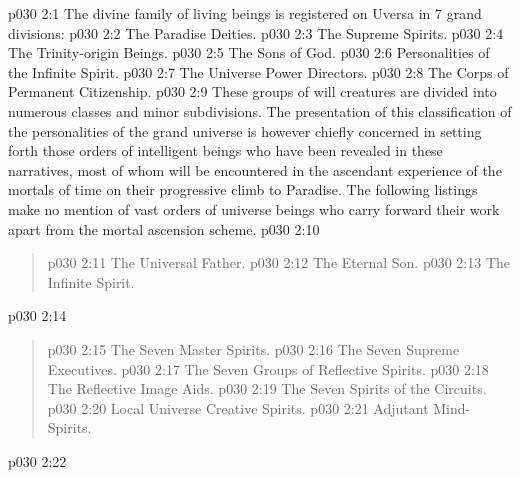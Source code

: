 \vs p030 2:1 The divine family of living beings is registered on Uversa in 7 grand divisions:
\vs p030 2:2 \bibnobreakspace The Paradise Deities.
\vs p030 2:3 \bibnobreakspace The Supreme Spirits.
\vs p030 2:4 \bibnobreakspace The Trinity\hyp{}origin Beings.
\vs p030 2:5 \bibnobreakspace The Sons of God.
\vs p030 2:6 \bibnobreakspace Personalities of the Infinite Spirit.
\vs p030 2:7 \bibnobreakspace The Universe Power Directors.
\vs p030 2:8 \bibnobreakspace The Corps of Permanent Citizenship.
\vs p030 2:9 \pc These groups of will creatures are divided into numerous classes and minor subdivisions. The presentation of this classification of the personalities of the grand universe is however chiefly concerned in setting forth those orders of intelligent beings who have been revealed in these narratives, most of whom will be encountered in the ascendant experience of the mortals of time on their progressive climb to Paradise. The following listings make no mention of vast orders of universe beings who carry forward their work apart from the mortal ascension scheme.
\vsetspace
\vs p030 2:10 \bibnobreakspace {}
\begin{quote}
\vs p030 2:11 \bibnobreakspace The Universal Father.
\vs p030 2:12 \bibnobreakspace The Eternal Son.
\vs p030 2:13 \bibnobreakspace The Infinite Spirit.
\end{quote}
\vsetspace
\vs p030 2:14 \bibnobreakspace {}
\begin{quote}
\vs p030 2:15 \bibnobreakspace The Seven Master Spirits.
\vs p030 2:16 \bibnobreakspace The Seven Supreme Executives.
\vs p030 2:17 \bibnobreakspace The Seven Groups of Reflective Spirits.
\vs p030 2:18 \bibnobreakspace The Reflective Image Aids.
\vs p030 2:19 \bibnobreakspace The Seven Spirits of the Circuits.
\vs p030 2:20 \bibnobreakspace Local Universe Creative Spirits.
\vs p030 2:21 \bibnobreakspace Adjutant Mind\hyp{}Spirits.
\end{quote}
\vsetspace
\vs p030 2:22 \bibnobreakspace {}

